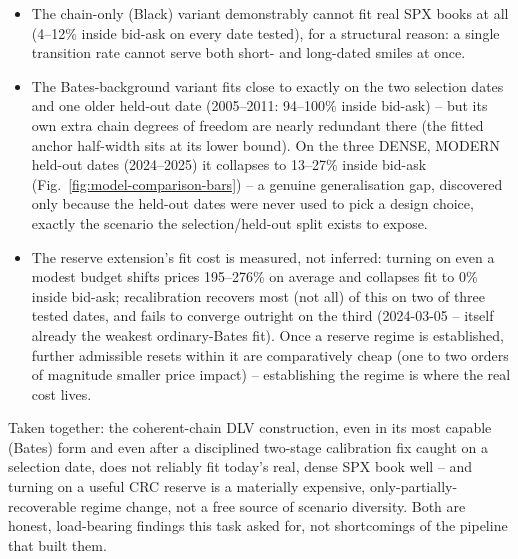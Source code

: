 \begin{itemize}
\item The chain-only (Black) variant demonstrably cannot fit real SPX
  books at all (4--12\% inside bid-ask on every date tested), for a
  structural reason: a single transition rate cannot serve both short- and
  long-dated smiles at once.
\item The Bates-background variant fits close to exactly on the two
  selection dates and one older held-out date (2005--2011: 94--100\%
  inside bid-ask) -- but its own extra chain degrees of freedom are nearly
  redundant there (the fitted anchor half-width sits at its lower bound).
  On the three DENSE, MODERN held-out dates (2024--2025) it collapses to
  13--27\% inside bid-ask (Fig.~\ref{fig:model-comparison-bars}) -- a
  genuine generalisation gap, discovered only because the held-out dates
  were never used to pick a design choice, exactly the scenario the
  selection/held-out split exists to expose.
\item The reserve extension's fit cost is measured, not inferred: turning
  on even a modest budget shifts prices 195--276\% on average and collapses
  fit to 0\% inside bid-ask; recalibration recovers most (not all) of this
  on two of three tested dates, and fails to converge outright on the
  third (2024-03-05 -- itself already the weakest ordinary-Bates fit).
  Once a reserve regime is established, further admissible resets within it
  are comparatively cheap (one to two orders of magnitude smaller price
  impact) -- establishing the regime is where the real cost lives.
\end{itemize}

Taken together: the coherent-chain DLV construction, even in its most
capable (Bates) form and even after a disciplined two-stage calibration
fix caught on a selection date, does not reliably fit today's real, dense
SPX book well -- and turning on a useful CRC reserve is a materially
expensive, only-partially-recoverable regime change, not a free source of
scenario diversity. Both are honest, load-bearing findings this task asked
for, not shortcomings of the pipeline that built them.

